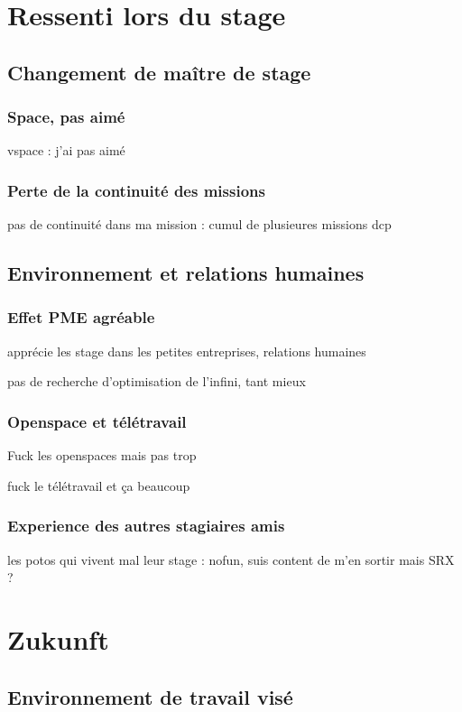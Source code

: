 \section{Ressenti lors du stage}
\subsection{Changement de maître de stage}
\subsubsection{Space, pas aimé}
vspace : j'ai pas aimé

\subsubsection{Perte de la continuité des missions}
pas de continuité dans ma mission : cumul de plusieures missions dcp


\subsection{Environnement et relations humaines}
\subsubsection{Effet PME agréable}
apprécie les stage dans les petites entreprises, relations humaines

pas de recherche d'optimisation de l'infini, tant mieux

\subsubsection{Openspace et télétravail}
Fuck les openspaces mais pas trop

fuck le télétravail et ça beaucoup

\subsubsection{Experience des autres stagiaires amis}
les potos qui vivent mal leur stage : nofun, suis content de m'en sortir mais SRX ?



\section{Zukunft}
\subsection{Environnement de travail visé}
